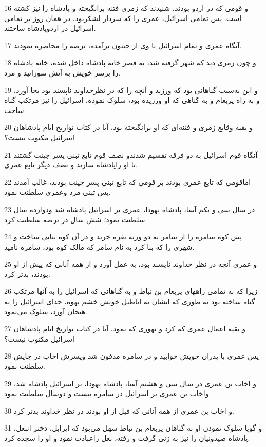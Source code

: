 \par 16 و قومی که در اردو بودند، شنیدند که زمری فتنه برانگیخته و پادشاه را نیز کشته است. پس تمامی اسرائیل، عمری را که سردار لشکربود، در همان روز بر تمامی اسرائیل در اردوپادشاه ساختند.
\par 17 آنگاه عمری و تمام اسرائیل با وی از جبتون برآمده، ترصه را محاصره نمودند.
\par 18 و چون زمری دید که شهر گرفته شد، به قصر خانه پادشاه داخل شده، خانه پادشاه را برسر خویش به آتش سوزانید و مرد.
\par 19 و این به‌سبب گناهانی بود که ورزید و آنچه را که در نظرخداوند ناپسند بود بجا آورد، و به راه یربعام و به گناهی که او ورزیده بود، سلوک نموده، اسرائیل را نیز مرتکب گناه ساخت.
\par 20 و بقیه وقایع زمری و فتنه‌ای که او برانگیخته بود، آیا در کتاب تواریخ ایام پادشاهان اسرائیل مکتوب نیست؟
\par 21 آنگاه قوم اسرائیل به دو فرقه تقسیم شدندو نصف قوم تابع تبنی پسر جینت گشتند تا او راپادشاه سازند و نصف دیگر تابع عمری.
\par 22 اماقومی که تابع عمری بودند بر قومی که تابع تبنی پسر جینت بودند، غالب آمدند پس تبنی مرد وعمری سلطنت نمود.
\par 23 در سال سی و یکم آسا، پادشاه یهودا، عمری بر اسرائیل پادشاه شد ودوازده سال سلطنت نمود؛ شش سال در ترصه سلطنت کرد.
\par 24 پس کوه سامره را از سامر به دو وزنه نقره خرید و در آن کوه بنایی ساخت و شهری را که بنا کرد به نام سامر که مالک کوه بود، سامره نامید.
\par 25 و عمری آنچه در نظر خداوند ناپسند بود، به عمل آورد و از همه آنانی که پیش از او بودند، بدتر کرد.
\par 26 زیرا که به تمامی راههای یربعام بن نباط و به گناهانی که اسرائیل را به آنها مرتکب گناه ساخته بود به طوری که ایشان به اباطیل خویش خشم یهوه، خدای اسرائیل را به هیجان آورد، سلوک می‌نمود.
\par 27 و بقیه اعمال عمری که کرد و تهوری که نمود، آیا در کتاب تواریخ ایام پادشاهان اسرائیل مکتوب نیست؟
\par 28 پس عمری با پدران خویش خوابید و در سامره مدفون شد وپسرش اخاب در جایش سلطنت نمود.
\par 29 و اخاب بن عمری در سال سی و هشتم آسا، پادشاه یهودا، بر اسرائیل پادشاه شد، واخاب بن عمری بر اسرائیل در سامره بیست و دوسال سلطنت نمود.
\par 30 و اخاب بن عمری از همه آنانی که قبل از او بودند در نظر خداوند بدتر کرد.
\par 31 و گویا سلوک نمودن او به گناهان یربعام بن نباط سهل می‌بود که ایزابل، دختر اتبعل، پادشاه صیدونیان را نیز به زنی گرفت و رفته، بعل راعبادت نمود و او را سجده کرد.
